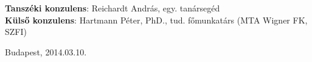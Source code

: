 \begin{flushleft}
\vspace*{1cm}
\textbf{Tanszéki konzulens}: Reichardt András, egy. tanársegéd\\
\textbf{Külső konzulens}: Hartmann Péter, PhD., tud. főmunkatárs (MTA Wigner FK,
SZFI)
\end{flushleft}



\begin{flushleft}
\vspace*{1cm}
Budapest, 2014.03.10.
\end{flushleft}
